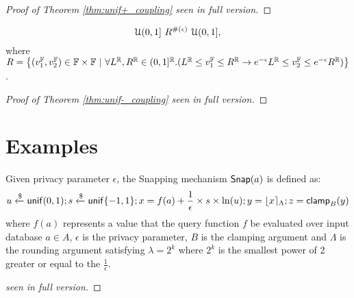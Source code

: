 \documentclass[a4paper,11pt]{article}
\begin{document}
%
\begin{proof}[Proof of Theorem \ref{thm:unif+_coupling} seen in full version]
%
\end{proof}
%
%
\begin{thm}
\label{thm:unif-_coupling}
$${\mathcal{U}(0,1]} ~ R^{\#(\epsilon)} ~ {\mathcal{U}(0,1]},$$
%
where
	$R = 
		\left \{(v^{\mathbb{F}}_1, v^{\mathbb{F}}_2) \in {\mathbb{F}} \times {\mathbb{F}} 
		~|~
		\forall L^{\mathbb{R}}, R^{\mathbb{R}} \in (0,1]^{\mathbb{R}}.
		(L^{\mathbb{R}} \leq v^{\mathbb{F}}_1 \leq R^{\mathbb{R}}
				\rightarrow
				e^{-\epsilon} L^{\mathbb{R}} \leq v^{\mathbb{F}}_2 \leq 	e^{-\epsilon} R^{\mathbb{R}})
		\right \}	
		$.
\end{thm}
%
\begin{proof}[Proof of Theorem \ref{thm:unif-_coupling} seen in full version]
%
\end{proof}
%
%
%
%
\newpage
\section{Examples}

\begin{defn}
Given privacy parameter $\epsilon$, the Snapping mechanism $\mathsf{Snap}(a)$ is defined as:
\[
	u \xleftarrow{\$} \mathsf{unif}(0,1); s \xleftarrow{\$} \mathsf{unif}\{-1, 1\};
	x = f(a) + \frac{1}{\epsilon} \times s \times \ln (u);
	y = \lfloor x \rceil_{\Lambda};
	z = \mathsf{clamp}_B (y)
\]
where $f(a)$ represents a value that the query function $f$ be evaluated over input database $a \in A$, $\epsilon$ is the privacy parameter, $B$ is the clamping argument and $\Lambda$ is the rounding argument satisfying $\lambda = 2^k$ where $2^k$ is the smallest power of 2 greater or equal to the $\frac{1}{\epsilon}$.
\end{defn}
%
\begin{thm}
\end{thm}
\begin{proof}[seen in full version]
\end{proof}

\newpage


\end{document}
